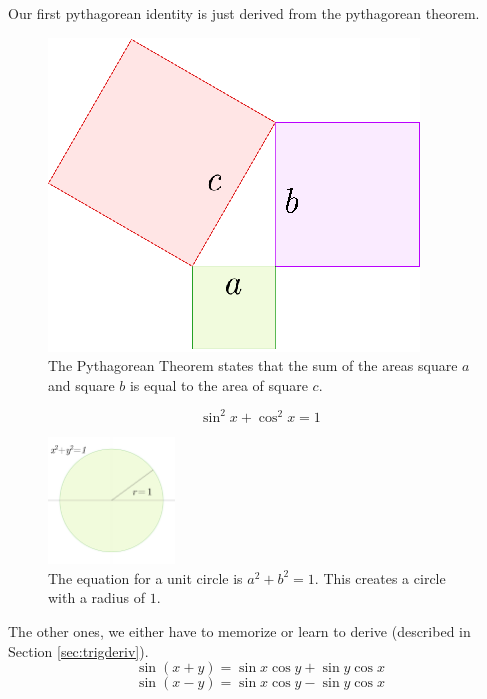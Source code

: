 Our first pythagorean identity is just derived from the pythagorean theorem.
\begin{figure}[H]
  \begin{center}
    \includegraphics{continuous/functions/pyth.eps}
  \end{center}
  \caption{The Pythagorean Theorem states that the sum of the areas square $a$ and square $b$ is equal to the area of square $c$.}
  \label{fig:pyth}
\end{figure}
\begin{equation}
  \sin^2x+\cos^2x=1
  \label{eq:pythtrig}
\end{equation}
\begin{figure}[H]
  \begin{center}
    \includegraphics[width=0.3\textwidth]{continuous/functions/unitcirc.eps}
  \end{center}
  \caption{The equation for a unit circle is $a^2+b^2=1$. This creates a circle with a radius of $1$.}
  \label{fig:basicuniticircle}
\end{figure}
The other ones, we either have to memorize or learn to derive (described in Section \ref{sec:trigderiv}).
\begin{equation}
  \sin{(x+y)} = \sin x \cos y + \sin y \cos x
\end{equation}
\begin{equation}
  \sin{(x-y)} = \sin x \cos y - \sin y \cos x
\end{equation}
